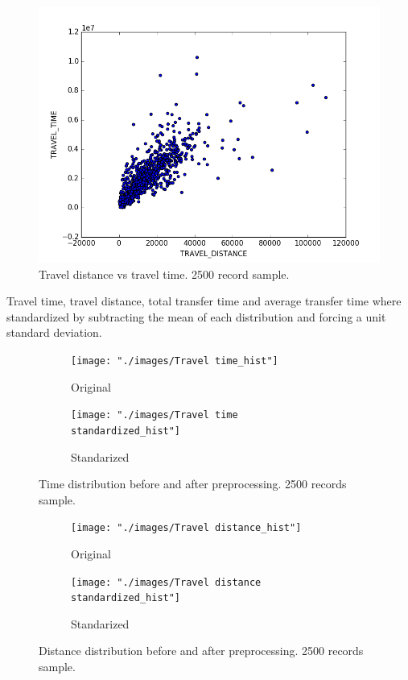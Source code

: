 \documentclass{article}
\begin{document}
\begin{figure}[H]
  \centering
  \includegraphics[width=.8\linewidth]{./images/distance_vs_time.png}
  \caption{Travel distance vs travel time. 2500 record sample.}
  \label{fig:preprocessing/distance_time_correlation}
\end{figure}

Travel time, travel distance, total transfer time and average transfer time where standardized by subtracting the mean of each distribution and forcing a unit standard deviation.

\begin{figure}[H]
  \centering
  \begin{subfigure}[b]{.45\textwidth}
  	\centering
  	\texttt{[image: "./images/Travel time\_hist"]}
  	\caption{Original}
  \end{subfigure}
  \begin{subfigure}[b]{.45\textwidth}
  	\centering
  	\texttt{[image: "./images/Travel time standardized\_hist"]}
  	\caption{Standarized}
  \end{subfigure}
  \caption{Time distribution before and after preprocessing. 2500 records sample.}
  	\label{fig:preprocessing/time}
\end{figure}

\begin{figure}[H]
  \centering
  \begin{subfigure}[b]{.45\textwidth}
  	\centering
  	\texttt{[image: "./images/Travel distance\_hist"]}
  	\caption{Original}
  \end{subfigure}
  \begin{subfigure}[b]{.45\textwidth}
  	\centering
  	\texttt{[image: "./images/Travel distance standardized\_hist"]}
  	\caption{Standarized}
  \end{subfigure}
  \caption{Distance distribution before and after preprocessing. 2500 records sample.}
  	\label{fig:preprocessing/distance}
\end{figure}
\end{document}
